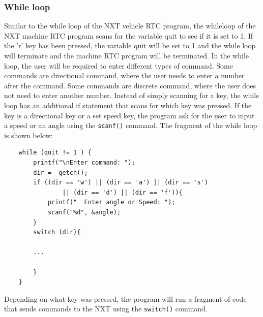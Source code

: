 \documentclass[12pt]{article}
\begin{document}
\subsubsection*{While loop}
Similar to the while loop of the NXT vehicle RTC program, the whileloop of the NXT machine RTC program scans for the
    variable quit to see if it is set to 1.
If the 'r' key has been pressed, the variable quit will be set to 1 and the while loop will terminate and the
    machine RTC program will be terminated.
In the while loop, the user will be required to enter different types of command.
Some commands are directional command, where the user needs to enter a number after the command.
Some commands are discrete command, where the user does not need to enter another number.
Instead of simply scanning for a key, the while loop has an additional if statement that scans for which key
    was pressed.
If the key is a directional key or a set speed key, the program ask for the user to input a speed or an angle using
    the \verb+scanf()+ command.
The fragment of the while loop is shown below:
\begin{verbatim}
    while (quit != 1 ) {
        printf("\nEnter command: ");
        dir = _getch();
        if ((dir == 'w') || (dir == 'a') || (dir == 's') 
                || (dir == 'd') || (dir == 'f')){
            printf("  Enter angle or Speed: ");
            scanf("%d", &angle);
        }
        switch (dir){
        
        ...
        
        }
    }
\end{verbatim}
Depending on what key was pressed, the program will run a fragment of code that sends commands to the NXT using the
    \verb+switch()+ command.
\end{document}
